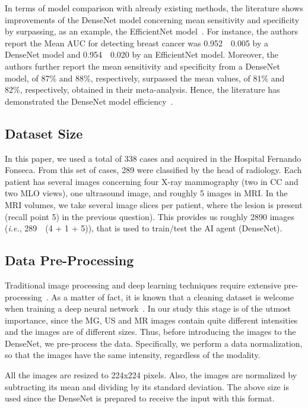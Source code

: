 In terms of model comparison with already existing methods, the literature shows improvements of the DenseNet model concerning mean sensitivity and specificity by surpassing, as an example, the EfficientNet model~\cite{jpm10040211}.
For instance, the authors report the Mean AUC for detecting breast cancer was 0.952~\textpm~0.005 by a DenseNet model and 0.954~\textpm~0.020 by an EfficientNet model.
Moreover, the authors further report the mean sensitivity and specificity from a DenseNet model, of 87\% and 88\%, respectively, surpassed the mean values, of 81\% and 82\%, respectively, obtained in their meta-analysis.
Hence, the literature has demonstrated the DenseNet model efficiency~\cite{8633197, Hai2019, Zhong_2020}.

\subsection{Dataset Size}
\label{sec:app003001002}

In this paper, we used a total of 338 cases and acquired in the Hospital Fernando Fonseca.
From this set of cases, 289 were classified by the head of radiology.
Each patient has several images concerning four  X-ray mammography (two in CC and two MLO views), one ultrasound image, and roughly 5 images in MRI.
In the MRI volumes, we take several image slices per patient, where the lesion is present (recall point 5) in the previous question).
This provides us roughly 2890 images ({\it i.e.}, 289~\texttimes~(4 + 1 + 5)), that is used to train/test the AI agent (DenseNet).

\subsection{Data Pre-Processing}
\label{sec:app003001003}

Traditional image processing and deep learning techniques require extensive pre-processing~\cite{Zhong_2020}.
As a matter of fact, it is known that a cleaning dataset is welcome when training a deep neural network~\cite{RIASATIAN2021102032}.
In our study this stage is of the utmost importance, since the MG, US and MR images contain quite different intensities and the images are of different sizes.
Thus, before introducing the images to the DenseNet, we pre-process the data.
Specifically, we perform a data normalization, so that the images have the same intensity, regardless of the modality.

All the images are resized to 224x224 pixels.
Also, the images are normalized by subtracting its mean and dividing by its standard deviation.
The above size is used since the DenseNet is prepared to receive the input with this format.


